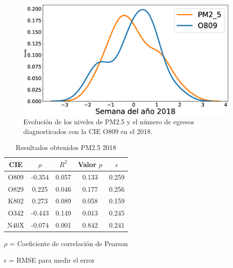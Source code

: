\begin{figure}[h!]
\setcounter{figure}{6} %
\captionsetup{type=figure} %
\begin{center}
   \includegraphics[trim=61 0 0 0,clip,width=1\textwidth]{PM2_5_O809_2018.eps}
   \end{center}
    \caption[Series de tiempo 2018 PM2.5 y O809]{Evolución de los niveles de PM2.5 y el número de egresos diagnosticados con la CIE O809 en el 2018.}
    \label{serie_de_tiempo_2018_PM25}
\end{figure}

\begin{table}[hbt!]
\centering
\caption{Resultados obtenidos PM2.5 2018}
\label{tab:Resultados obtenidos PM2.5 2018}
\vspace{0.5cm}
\begin{threeparttable}
\begin{tabular}{|c|c|c|c|c|}
	\hline
	CIE & $\rho$ & $R^2$ & Valor $p$ & $\epsilon$\\
	\hline
	O809 & -0.354 & 0.057 & 0.133 & 0.259 \\
	\hline
	O829 & 0.225 & 0.046 & 0.177 & 0.256 \\
	\hline
	K802 & 0.273 & 0.089 & 0.058 & 0.159 \\
	\hline
	O342 & -0.443 & 0.149 & 0.013 & 0.245 \\
	\hline
	N40X & -0.074 & 0.001 & 0.842 & 0.241 \\
	\hline
\end{tabular}
\begin{tablenotes}
\footnotesize
\item{$\rho$ = Coeficiente de correlación de Pearson}
\item{$\epsilon$ = RMSE para medir el error}
\end{tablenotes}
\end{threeparttable}
\end{table}

